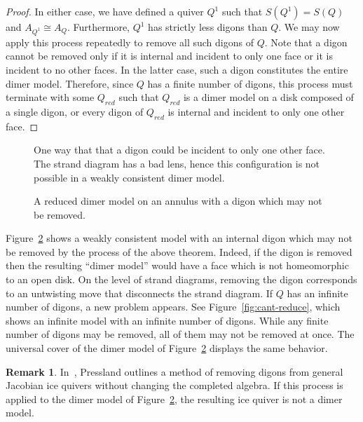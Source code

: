 \documentclass{article}
\theoremstyle{definition}
\newtheorem{remk}[thm]{Remark}
\begin{document}
\begin{proof}
		In either case, we have defined a quiver $Q^1$ such that $S(Q^1)=S(Q)$ and $A_{Q^1}\cong A_Q$. Furthermore, $Q^1$ has strictly less digons than $Q$. We may now apply this process repeatedly to remove all such digons of $Q$.  Note that a digon cannot be removed only if it is internal and incident to only one face or it is incident to no other faces.  In the latter case, such a digon constitutes the entire dimer model.
		Therefore, since $Q$ has a finite number of digons, this process must terminate with some $Q_{red}$ such that $Q_{red}$ is a dimer model on a disk composed of a single digon, or every digon of $Q_{red}$ is internal and incident to only one other face. 
\end{proof}

\def\svgwidth{70pt}
\begin{figure}
	\centering
	
	\caption{One way that that a digon could be incident to only one other face. The strand diagram has a bad lens, hence this configuration is not possible in a weakly consistent dimer model.}
	\label{fig:tr-annulus}
\end{figure}

\def\svgwidth{120pt}
\begin{figure}
	\centering
	
	\caption{A reduced dimer model on an annulus with a digon which may not be removed.} 
	\label{fig:non-red-annulus}
\end{figure}

Figure~\ref{fig:non-red-annulus} shows a weakly consistent model with an internal digon which may not be removed by the process of the above theorem. Indeed, if the digon is removed then the resulting ``dimer model'' would have a face which is not homeomorphic to an open disk. On the level of strand diagrams, removing the digon corresponds to an untwisting move that disconnects the strand diagram. 
If $Q$ has an infinite number of digons, a new problem appears. See Figure~\ref{fig:cant-reduce}, which shows an infinite model with an infinite number of digons. While any finite number of digons may be removed, all of them may not be removed at once. The universal cover of the dimer model of Figure~\ref{fig:non-red-annulus} displays the same behavior. 



\begin{remk}
	In~\cite[\S3]{XPressland2020}, Pressland outlines a method of removing digons from general Jacobian ice quivers without changing the completed algebra. If this process is applied to the dimer model of Figure~\ref{fig:non-red-annulus}, the resulting ice quiver is not a dimer model.
\end{remk}
\end{document}
